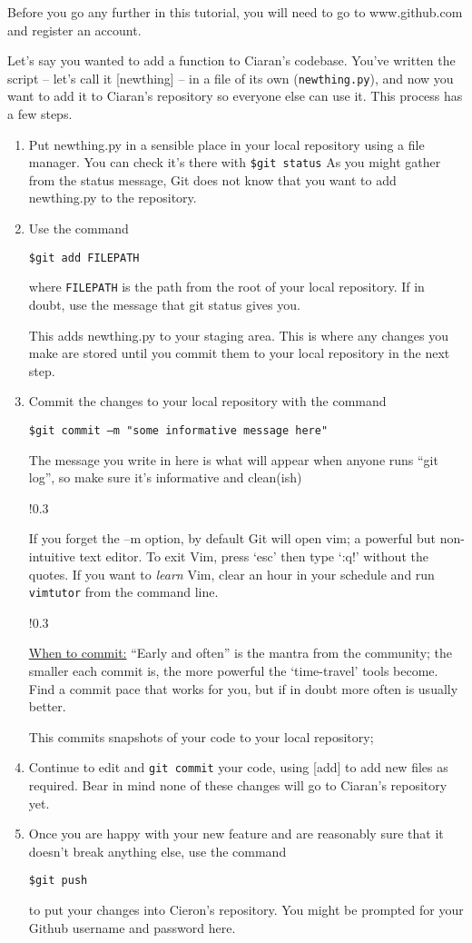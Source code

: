 \documentclass[11pt, a4paper, english]{article}
\newenvironment{wrapbox}
	{
		\begin{wrapfigure}{!}{0.3\textwidth}
		\begin{tcolorbox}
	}
	{
		\end{tcolorbox}
		\end{wrapfigure}
	}
\begin{document}
Before you go any further in this tutorial, you will need to go to www.github.com and register an account.

Let’s say you wanted to add a function to Ciaran’s codebase. You’ve written the script – let’s call it [newthing] – in a file of its own (\verb|newthing.py|), and now you want to add it to Ciaran’s repository so everyone else can use it. This process has a few steps.

\begin{enumerate}
\item Put newthing.py in a sensible place in your local repository using a file manager. You can check it’s there with \verb|$git status|
As you might gather from the status message, Git does not know that you want to add newthing.py to the repository.
\item Use the command
\begin{verbatim}
$git add FILEPATH
\end{verbatim}
where \verb|FILEPATH| is the path from the root of your local repository. If in doubt, use the message that git status gives you.

This adds newthing.py to your staging area. This is where any changes you make are stored until you commit them to your local repository in the next step.

\item Commit the changes to your local repository with the command
\begin{verbatim}
$git commit –m "some informative message here"
\end{verbatim}
The message you write in here is what will appear when anyone runs “git log”, so make sure it’s informative and clean(ish)
\begin{wrapbox} 
If you forget the –m option, by default Git will open vim; a powerful but non-intuitive text editor. To exit Vim, press ‘esc’ then type ‘:q!’ without the quotes. If you want to \textit{learn} Vim, clear an hour in your schedule and run \verb|vimtutor| from the command line.
\end{wrapbox}
\begin{wrapbox}\underline{When to commit:} “Early and often” is the mantra from the community; the smaller each commit is, the more powerful the ‘time-travel’ tools become. Find a commit pace that works for you, but if in doubt more often is usually better.
\end{wrapbox}
This commits snapshots of your code to your local repository; 
\item Continue to edit and \verb|git commit| your code, using [add] to add new files as required. Bear in mind none of these changes will go to Ciaran’s repository yet.
\item Once you are happy with your new feature and are reasonably sure that it doesn’t break anything else, use the command
\begin{verbatim}
$git push
\end{verbatim}
to put your changes into Cieron’s repository. You might be prompted for your Github username and password here.
\end{enumerate}
\end{document}
